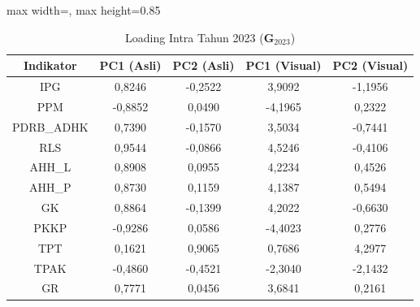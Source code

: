\begin{table}[H]
\centering
\caption{Loading Intra Tahun 2023 ($\mathbf{G}_{2023}$)} \label{tab:app1loading_intra_2023}
\begin{adjustbox}{max width=\textwidth, max height=0.85\textheight}
\begin{tabular}{|c|c|c|c|c|}
\hline
\textbf{Indikator} & \textbf{PC1 (Asli)} & \textbf{PC2 (Asli)} & \textbf{PC1 (Visual)} & \textbf{PC2 (Visual)} \\
\hline
IPG & 0,8246 & -0,2522 & 3,9092 & -1,1956 \\
PPM & -0,8852 & 0,0490 & -4,1965 & 0,2322 \\
PDRB\_ADHK & 0,7390 & -0,1570 & 3,5034 & -0,7441 \\
RLS & 0,9544 & -0,0866 & 4,5246 & -0,4106 \\
AHH\_L & 0,8908 & 0,0955 & 4,2234 & 0,4526 \\
AHH\_P & 0,8730 & 0,1159 & 4,1387 & 0,5494 \\
GK & 0,8864 & -0,1399 & 4,2022 & -0,6630 \\
PKKP & -0,9286 & 0,0586 & -4,4023 & 0,2776 \\
TPT & 0,1621 & 0,9065 & 0,7686 & 4,2977 \\
TPAK & -0,4860 & -0,4521 & -2,3040 & -2,1432 \\
GR & 0,7771 & 0,0456 & 3,6841 & 0,2161 \\
\hline
\end{tabular}
\end{adjustbox}
\end{table}